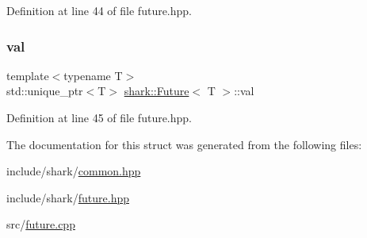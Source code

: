 Definition at line 44 of file future.\+hpp.

\hypertarget{structshark_1_1_future_ad47e70b84ce6303568af0bd6aca991da}{}\label{structshark_1_1_future_ad47e70b84ce6303568af0bd6aca991da} 
\subsubsection{\texorpdfstring{val}{val}}
{\footnotesize\ttfamily template$<$typename T$>$ \\
std\+::unique\+\_\+ptr$<$T$>$ \hyperlink{structshark_1_1_future}{shark\+::\+Future}$<$ T $>$\+::val}



Definition at line 45 of file future.\+hpp.



The documentation for this struct was generated from the following files\+:\begin{DoxyCompactItemize}
\item 
include/shark/\hyperlink{common_8hpp}{common.\+hpp}\item 
include/shark/\hyperlink{future_8hpp}{future.\+hpp}\item 
src/\hyperlink{future_8cpp}{future.\+cpp}\end{DoxyCompactItemize}
